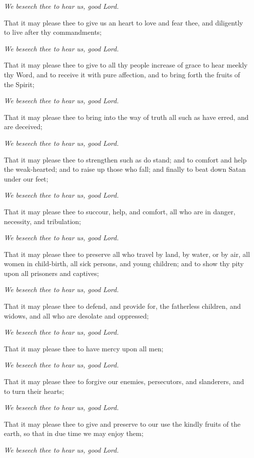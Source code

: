 \emph{We beseech thee to hear us, good Lord.}

That it may please thee to give us an heart to love and fear thee, and
diligently to live after thy commandments; 

\emph{We beseech thee to hear us, good Lord.}

That it may please thee to give to all thy people increase
of grace to hear meekly thy Word, and to receive it with pure affection,
and to bring forth the fruits of the Spirit; 

\emph{We beseech thee to hear us, good Lord.}

That it may please thee to bring into the way of truth
all such as have erred, and are deceived; 

\emph{We beseech thee to hear us, good Lord.}

That it may please thee to strengthen such as do stand;
and to comfort and help the weak-hearted; and to raise up those who fall;
and finally to beat down Satan under our feet; 

\emph{We beseech thee to hear us, good Lord.}

That it may please thee to succour, help, and comfort,
all who are in danger, necessity, and tribulation; 

\emph{We beseech thee to hear us, good Lord.}

That it may please thee to preserve all who travel
by land, by water, or by air, all women in child-birth, all sick persons,
and young children; and to show thy pity upon all prisoners and captives;

\emph{We beseech thee to hear us, good Lord.}

That it may please thee to defend, and provide for,
the fatherless children, and widows, and all who are desolate and oppressed;

\emph{We beseech thee to hear us, good Lord.}

That it may please thee to have mercy upon all men;

\emph{We beseech thee to hear us, good Lord.}

That it may please thee to forgive our enemies, persecutors,
and slanderers, and to turn their hearts; 

\emph{We beseech thee to hear us, good Lord.}

That it may please thee to give and preserve to our
use the kindly fruits of the earth, so that in due time we may enjoy them;

\emph{We beseech thee to hear us, good Lord.}

